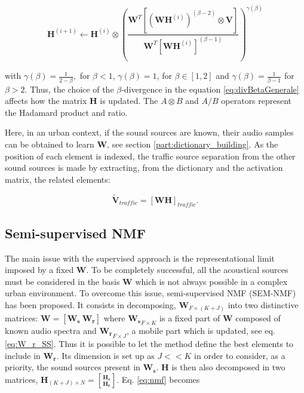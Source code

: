 \documentclass[review,5p,twocolumn,sort&compress,times]{elsarticle}
\begin{document}
\begin{equation} \label{eq:updateH}
\textbf{H}^{(i+1)} \leftarrow \textbf{H}^{(i)}\otimes\left(\frac{\textbf{W}^T \left[\left(\textbf{WH}^{(i)} \right)^{(\beta-2)}\otimes\textbf{V} \right]}{\textbf{W}^T \left[\textbf{WH}^{(i)} \right]^{(\beta-1)}}\right)^{\gamma(\beta)}
\end{equation}

with $\gamma(\beta) = \frac{1}{2-\beta},$ for $\beta < 1$, $ \gamma(\beta) = 1$, for $\beta \in \left[1,2\right]$ and $\gamma(\beta) = \frac{1}{\beta-1}$ for $\beta > 2$. Thus, the choice of the $\beta$-divergence in the equation \ref{eq:divBetaGenerale} affects how the matrix $\mathbf{H}$ is updated. The $A\otimes B$ and $A/B$ operators represent the Hadamard product and ratio.

Here, in an urban context, if the sound sources are known, their audio samples can be obtained to learn $\mathbf{W}$, see section \ref{part:dictionary_building}. As the position of each element is indexed, the traffic source separation from the other sound sources is made by extracting, from the dictionary and the activation matrix, the related elements:

\begin{equation}\label{eq:separationExtraction}
\mathbf{\tilde{V}}_{traffic} = \left[ \mathbf{WH} \right]_{traffic}.
\end{equation}

\subsection{Semi-supervised NMF}

The main issue with the supervised approach is the representational limit imposed by a fixed $\mathbf{W}$. To be completely successful, all the acoustical sources must be considered in the basis $\mathbf{W}$ which is not always possible in a complex urban environment. To overcome this issue, semi-supervised NMF (SEM-NMF) \cite{lee_semi-supervised_2010} has been proposed. It consists in decomposing, $\mathbf{W}_{F \times (K+J)}$ into two distinctive matrices: $\mathbf{W} = \left[ \mathbf{W_s}~\mathbf{W_r} \right]$ where $\mathbf{W_s}_{F \times K}$ is a fixed part of $\mathbf{W}$ composed of known audio spectra and $ \mathbf{W_r}_{F \times J}$, a mobile part which is updated, see eq. \ref{eq:W_r_SS}. Thus it is possible to let the method define the best elements to include in $\mathbf{W_r}$. Its dimension is set up as $J << K$ in order to consider, as a priority, the sound sources present in $\mathbf{W_s}$. $\mathbf{H}$ is then also decomposed in two matrices, $\mathbf{H}_{(K+J) \times N} = \genfrac[]{0pt}{0}{\mathbf{H_s}}{\mathbf{H_r}}$. Eq. \ref{eq:nmf} becomes
\end{document}
